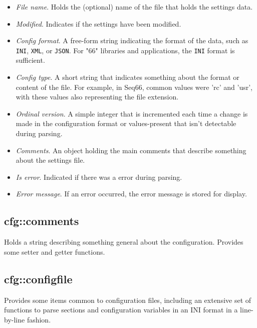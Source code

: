    \begin{itemize}
      \item \textsl{File name}.
         Holds the (optional) name of the file that holds the settings data.
      \item \textsl{Modified}.
         Indicates if the settings have been modified.
      \item \textsl{Config format}.
         A free-form string indicating the format of the data, such as
         \texttt{INI}, \texttt{XML}, or \texttt{JSON}.
         For "66" libraries and applications, the \texttt{INI}
         format is sufficient.
      \item \textsl{Config type}.
         A short string that indicates something about the
         format or content of the file. For example, in Seq66,
         common values were 'rc' and 'usr', with these
         values also representing the file extension.
      \item \textsl{Ordinal version}.
         A simple integer that is incremented each time a change is
         made in the configuration format or values-present
         that isn't detectable during parsing.
      \item \textsl{Comments}.
         An object holding the main comments that describe something
         about the settings file.
      \item \textsl{Is error}.
         Indicated if there was a error during parsing.
      \item \textsl{Error message}.
         If an error occurred, the error message is stored for display.
   \end{itemize}

\subsection{cfg::comments}
\label{subsec:cfg_namespace_comments}

   Holds a string describing something general about the configuration.
   Provides some setter and getter functions.

\subsection{cfg::configfile}
\label{subsec:cfg_namespace_configfile}

   Provides some items common to configuration files, including
   an extensive set of functions to parse sections and configuration
   variables in an
   INI format in a line-by-line fashion.

